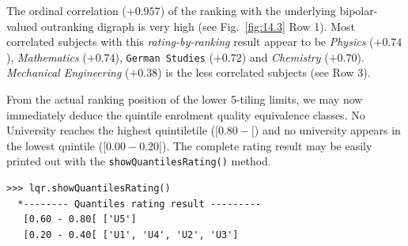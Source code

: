 The ordinal correlation ($+0.957$) of the \NetFlows ranking with the underlying bipolar-valued outranking digraph is very high (see Fig.~\vref{fig:14.3} Row 1). Most correlated subjects with this \emph{rating-by-ranking} result appear to be \emph{Physics} ($+0.74$), \emph{Mathematics} ($+0.74$), \texttt{German Studies} ($+0.72$) and \emph{Chemistry} ($+0.70$). \emph{Mechanical Engineering} ($+0.38$) is the less correlated subjects (see Row 3).

From the actual ranking position of the lower 5-tiling limits, we may now immediately deduce the quintile enrolment quality equivalence classes. No University reaches the highest quintiletile ($[0.80 - [$) and no university appears in the lowest quintile ($[0.00- 0.20[$). The complete rating result may be easily printed out with the \texttt{showQuantilesRating()} method.
\begin{lstlisting}[caption={Showing the quintiling of the enrolment quality of the 5 Universities},label=list:14.3]
>>> lqr.showQuantilesRating()
  *-------- Quantiles rating result ---------
   [0.60 - 0.80[ ['U5']
   [0.20 - 0.40[ ['U1', 'U4', 'U2', 'U3']
\end{lstlisting}

